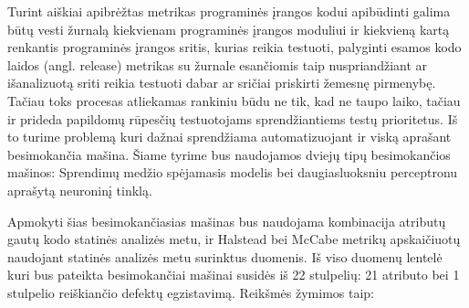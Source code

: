 \documentclass{VUMIFPSbakalaurinis}
\begin{document}
Turint aiškiai apibrėžtas metrikas programinės įrangos kodui apibūdinti galima būtų vesti žurnalą kiekvienam programinės įrangos moduliui ir kiekvieną kartą renkantis programinės įrangos sritis, kurias reikia testuoti, palyginti esamos kodo laidos (angl. release) metrikas su žurnale esančiomis taip nuspriandžiant ar išanalizuotą sriti reikia testuoti dabar ar sričiai priskirti žemesnę pirmenybę. Tačiau toks procesas atliekamas rankiniu būdu ne tik, kad ne taupo laiko, tačiau ir prideda papildomų rūpesčių testuotojams sprendžiantiems testų prioritetus. Iš to turime problemą kuri dažnai sprendžiama automatizuojant ir viską aprašant besimokančia mašina. Šiame tyrime bus naudojamos dviejų tipų besimokančios mašinos: Sprendimų medžio spėjamasis modelis bei daugiasluoksniu perceptronu aprašytą neuroninį tinklą.

Apmokyti šias besimokančiasias mašinas bus naudojama kombinacija atributų gautų kodo statinės analizės metu, ir Halstead bei McCabe metrikų apskaičiuotų naudojant statinės analizės metu surinktus duomenis. Iš viso duomenų lentelė kuri bus pateikta besimokančiai mašinai susidės iš 22 stulpelių: 21 atributo bei 1 stulpelio reiškiančio defektų egzistavimą. Reikšmės žymimos taip:
\end{document}
